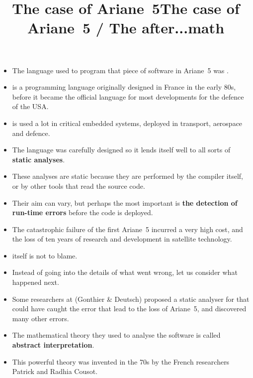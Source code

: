 \documentclass[wide]{slides}
\begin{document}
\begin{slide}
  \title{The case of Ariane~5}

  \begin{itemize}

    \item The language used to program that piece of software in
      Ariane~5 was \Ada.

    \item \Ada is a programming language originally designed in France
      in the early 80s, before it became the official language for
      most developments for the defence of the USA.

    \item \Ada is used a lot in critical embedded systems, deployed in
      transport, aerospace and defence.

    \item The language was carefully designed so it lends itself well
      to all sorts of \textbf{static analyses}.

    \item These analyses are static because they are performed by the
      \Ada compiler itself, or by other tools that read the source
      code.

    \item Their aim can vary, but perhaps the most important is
      \textbf{the detection of run\hyp{}time errors} before the code
      is deployed.

  \end{itemize}

\end{slide}

\begin{slide}
  \title{The case of Ariane~5 / The after...math}

  \begin{itemize}

    \item The catastrophic failure of the first Ariane~5 incurred a
      very high cost, and the loss of ten years of research and
      development in satellite technology.

    \item \Ada itself is not to blame.

    \item Instead of going into the details of what went wrong, let us
      consider what happened next.

    \item Some researchers at \Inria (Gonthier \& Deutsch) proposed a
      static analyser for \Ada that could have caught the error that
      lead to the loss of Ariane~5, and discovered many other errors.

    \item The mathematical theory they used to analyse the software is
      called \textbf{abstract interpretation}.

    \item This powerful theory was invented in the 70s by the French
      researchers Patrick and Radhia Cousot.

  \end{itemize}
\end{slide}
\end{document}
